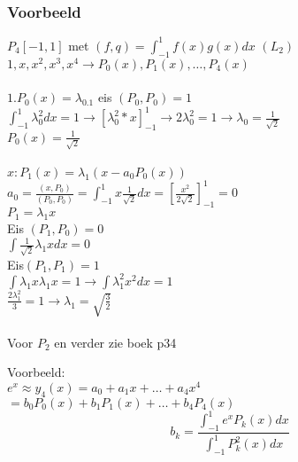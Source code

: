 \subsubsection{Voorbeeld}
$P_4[-1,1]$ met $(f,q)=\int_{-1}^1 f(x)g(x)dx$ $(L_2)$ \\
$1,x,x^2,x^3,x^4 \rightarrow P_0(x),P_1(x),\ldots,P_4(x)$ \\\\
$1.P_0(x)=\lambda_0.1$ eis $(P_0,P_0)=1$ \\
$\int_{-1}^1\lambda_0^2dx = 1 \rightarrow [\lambda_0^2*x]_{-1}^1 \rightarrow 2\lambda_0^2=1 \rightarrow \lambda_0=\frac{1}{\sqrt{2}}$ \\
$ P_0(x) = \frac{1}{\sqrt{2}}$ \\\\
$x: P_1(x)=\lambda_1(x-a_0P_0(x))$ \\
$a_0=\frac{(x,P_0)}{(P_0,P_0)} = \int_{-1}^1 x \frac{1}{\sqrt{2}} dx = [\frac{x^2}{2 \sqrt{2}}]_{-1}^1=0$\\
$P_1=\lambda_1 x$ \\
Eis $(P_1,P_0)= 0$ \\
$\int \frac{1}{\sqrt{2}}\lambda_1 x dx =0$ \\
Eis$(P_1,P_1)= 1$ \\
$\int \lambda_1x\lambda_1x=1 \rightarrow \int \lambda_1^2 x^2 dx = 1$ \\
$\frac{2\lambda_1^2}{3}=1 \rightarrow \lambda_1 = \sqrt{\frac{3}{2}}$ \\\\
Voor $P_2$ en verder zie boek p34

Voorbeeld: \\
$e^x \approx y_4(x)=a_0+a_1x+\ldots+a_4x^4$ \\
$ = b_0P_0(x)+b_1P_1(x)+\ldots+b_4P_4(x)$\\
\begin{equation*}
b_k = \frac{\int_{-1}^1 e^xP_k(x) dx}{\int_{-1}^1 P_k^2(x) dx}
\end{equation*}